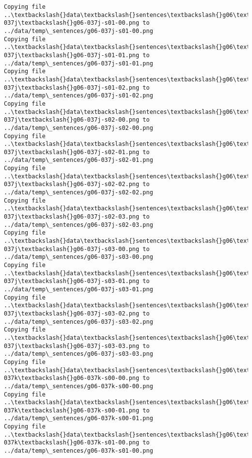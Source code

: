 \documentclass[11pt]{article}
\begin{document}
\begin{Verbatim}[commandchars=\\\{\}]
Copying file ..\textbackslash{}data\textbackslash{}sentences\textbackslash{}g06\textbackslash{}g06-037j\textbackslash{}g06-037j-s01-00.png to
../data/temp\_sentences/g06-037j-s01-00.png
Copying file ..\textbackslash{}data\textbackslash{}sentences\textbackslash{}g06\textbackslash{}g06-037j\textbackslash{}g06-037j-s01-01.png to
../data/temp\_sentences/g06-037j-s01-01.png
Copying file ..\textbackslash{}data\textbackslash{}sentences\textbackslash{}g06\textbackslash{}g06-037j\textbackslash{}g06-037j-s01-02.png to
../data/temp\_sentences/g06-037j-s01-02.png
Copying file ..\textbackslash{}data\textbackslash{}sentences\textbackslash{}g06\textbackslash{}g06-037j\textbackslash{}g06-037j-s02-00.png to
../data/temp\_sentences/g06-037j-s02-00.png
Copying file ..\textbackslash{}data\textbackslash{}sentences\textbackslash{}g06\textbackslash{}g06-037j\textbackslash{}g06-037j-s02-01.png to
../data/temp\_sentences/g06-037j-s02-01.png
Copying file ..\textbackslash{}data\textbackslash{}sentences\textbackslash{}g06\textbackslash{}g06-037j\textbackslash{}g06-037j-s02-02.png to
../data/temp\_sentences/g06-037j-s02-02.png
Copying file ..\textbackslash{}data\textbackslash{}sentences\textbackslash{}g06\textbackslash{}g06-037j\textbackslash{}g06-037j-s02-03.png to
../data/temp\_sentences/g06-037j-s02-03.png
Copying file ..\textbackslash{}data\textbackslash{}sentences\textbackslash{}g06\textbackslash{}g06-037j\textbackslash{}g06-037j-s03-00.png to
../data/temp\_sentences/g06-037j-s03-00.png
Copying file ..\textbackslash{}data\textbackslash{}sentences\textbackslash{}g06\textbackslash{}g06-037j\textbackslash{}g06-037j-s03-01.png to
../data/temp\_sentences/g06-037j-s03-01.png
Copying file ..\textbackslash{}data\textbackslash{}sentences\textbackslash{}g06\textbackslash{}g06-037j\textbackslash{}g06-037j-s03-02.png to
../data/temp\_sentences/g06-037j-s03-02.png
Copying file ..\textbackslash{}data\textbackslash{}sentences\textbackslash{}g06\textbackslash{}g06-037j\textbackslash{}g06-037j-s03-03.png to
../data/temp\_sentences/g06-037j-s03-03.png
Copying file ..\textbackslash{}data\textbackslash{}sentences\textbackslash{}g06\textbackslash{}g06-037k\textbackslash{}g06-037k-s00-00.png to
../data/temp\_sentences/g06-037k-s00-00.png
Copying file ..\textbackslash{}data\textbackslash{}sentences\textbackslash{}g06\textbackslash{}g06-037k\textbackslash{}g06-037k-s00-01.png to
../data/temp\_sentences/g06-037k-s00-01.png
Copying file ..\textbackslash{}data\textbackslash{}sentences\textbackslash{}g06\textbackslash{}g06-037k\textbackslash{}g06-037k-s01-00.png to
../data/temp\_sentences/g06-037k-s01-00.png

\end{Verbatim}
\end{document}
